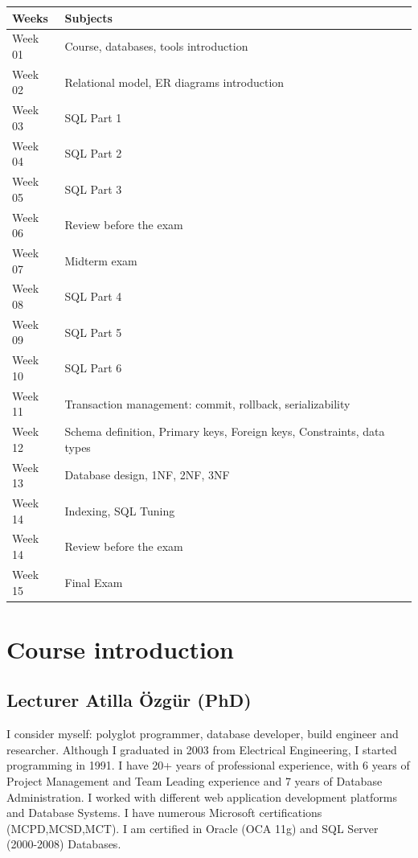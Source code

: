 \documentclass[
  letterpaper,
  DIV=11,
  numbers=noendperiod]{scrreprt}
\begin{document}
\begin{longtable}[]{@{}
  >{\raggedright\arraybackslash}p{}
  >{\raggedright\arraybackslash}p{}@{}}
\toprule\noalign{}
\begin{minipage}[b]{\linewidth}\raggedright
Weeks
\end{minipage} & \begin{minipage}[b]{\linewidth}\raggedright
Subjects
\end{minipage} \\
\midrule\noalign{}
\endhead
\bottomrule\noalign{}
\endlastfoot
Week 01 & Course, databases, tools introduction \\
Week 02 & Relational model, ER diagrams introduction \\
Week 03 & SQL Part 1 \\
Week 04 & SQL Part 2 \\
Week 05 & SQL Part 3 \\
Week 06 & Review before the exam \\
Week 07 & Midterm exam \\
Week 08 & SQL Part 4 \\
Week 09 & SQL Part 5 \\
Week 10 & SQL Part 6 \\
Week 11 & Transaction management: commit, rollback, serializability \\
Week 12 & Schema definition, Primary keys, Foreign keys, Constraints,
data types \\
Week 13 & Database design, 1NF, 2NF, 3NF \\
Week 14 & Indexing, SQL Tuning \\
Week 14 & Review before the exam \\
Week 15 & Final Exam \\
\end{longtable}

\chapter{Course introduction}\label{course-introduction}

\section{Lecturer Atilla Özgür
(PhD)}\label{lecturer-atilla-uxf6zguxfcr-phd}

I consider myself: polyglot programmer, database developer, build
engineer and researcher. Although I graduated in 2003 from Electrical
Engineering, I started programming in 1991. I have 20+ years of
professional experience, with 6 years of Project Management and Team
Leading experience and 7 years of Database Administration. I worked with
different web application development platforms and Database Systems. I
have numerous Microsoft certifications (MCPD,MCSD,MCT). I am certified
in Oracle (OCA 11g) and SQL Server (2000-2008) Databases.
\end{document}
